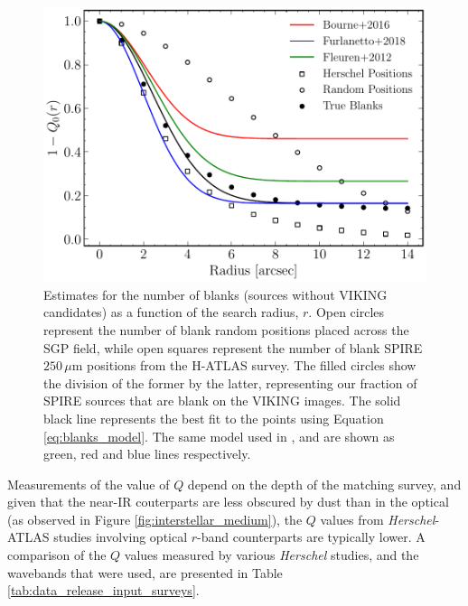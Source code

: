 \begin{figure}
    \centering
	\includegraphics[width=0.8\columnwidth]{Figures/Q_estimate.pdf}
	\caption[An estimate for the number of blank sources as a function of search radius]{Estimates for the number of blanks (sources without VIKING candidates) as a function of the search radius, $r$. Open circles represent the number of blank random positions placed across the SGP field, while open squares represent the number of blank SPIRE $250\,\mu$m positions from the H-ATLAS survey. The filled circles show the division of the former by the latter, representing our fraction of SPIRE sources that are blank on the VIKING images. The solid black line represents the best fit to the points using Equation \ref{eq:blanks_model}. The same model used in \citealt{Fleuren_2012}, \citealt{Bourne_2016} and \citealt{Furlanetto_2018} are shown as green, red and blue lines respectively.}
	\label{fig:Q_estimate}
\end{figure}

Measurements of the value of $Q$ depend on the depth of the matching survey, and given that the near-IR couterparts are less obscured by dust than in the optical (as observed in Figure \ref{fig:interstellar_medium}), the $Q$ values from \textit{Herschel}-ATLAS studies involving optical $r$-band counterparts are typically lower. A comparison of the $Q$ values measured by various \textit{Herschel} studies, and the wavebands that were used, are presented in Table \ref{tab:data_release_input_surveys}.

